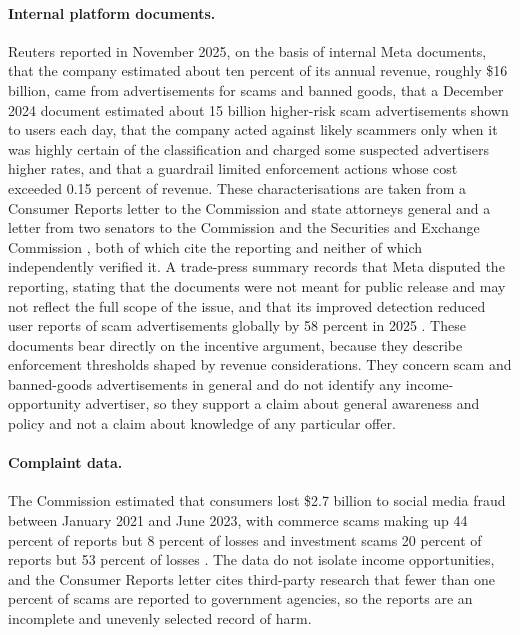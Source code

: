 \documentclass[12pt, a4paper]{article}
\begin{document}
\paragraph{Internal platform documents.} Reuters reported in November 2025, on the basis of internal Meta documents, that the company estimated about ten percent of its annual revenue, roughly \$16 billion, came from advertisements for scams and banned goods, that a December 2024 document estimated about 15 billion higher-risk scam advertisements shown to users each day, that the company acted against likely scammers only when it was highly certain of the classification and charged some suspected advertisers higher rates, and that a guardrail limited enforcement actions whose cost exceeded 0.15 percent of revenue. These characterisations are taken from a Consumer Reports letter to the Commission and state attorneys general \citep{ConsumerReports2025} and a letter from two senators to the Commission and the Securities and Exchange Commission \citep{BlumenthalHawley2025}, both of which cite the reporting and neither of which independently verified it. A trade-press summary records that Meta disputed the reporting, stating that the documents were not meant for public release and may not reflect the full scope of the issue, and that its improved detection reduced user reports of scam advertisements globally by 58 percent in 2025 \citep{MarketingDive2025}. These documents bear directly on the incentive argument, because they describe enforcement thresholds shaped by revenue considerations. They concern scam and banned-goods advertisements in general and do not identify any income-opportunity advertiser, so they support a claim about general awareness and policy and not a claim about knowledge of any particular offer.

\paragraph{Complaint data.} The Commission estimated that consumers lost \$2.7 billion to social media fraud between January 2021 and June 2023, with commerce scams making up 44 percent of reports but 8 percent of losses and investment scams 20 percent of reports but 53 percent of losses \citep{MediaPost2023}. The data do not isolate income opportunities, and the Consumer Reports letter cites third-party research that fewer than one percent of scams are reported to government agencies, so the reports are an incomplete and unevenly selected record of harm.
\end{document}
